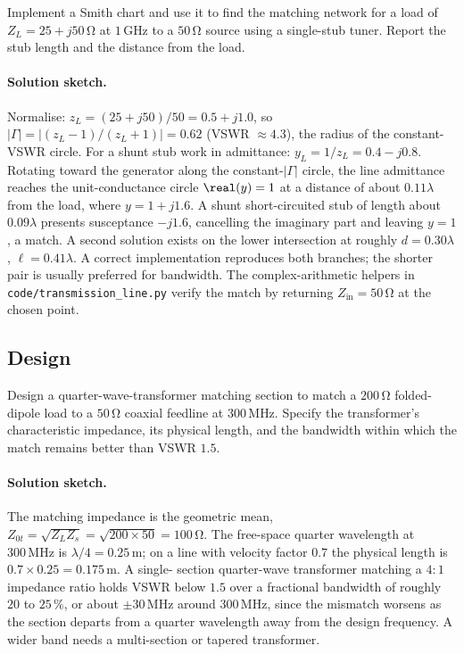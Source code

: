 \begin{exercise}
Implement a Smith chart and use it to find the matching network for a
load of $Z_{L} = 25 + j50\,\si{\ohm}$ at $1\,\si{\giga\hertz}$ to a
$50\,\si{\ohm}$ source using a single-stub tuner. Report the stub
length and the distance from the load.
\paragraph{Solution sketch.} Normalise: $z_{L} = (25+j50)/50 = 0.5 +
j1.0$, so $|\Gamma| = |(z_{L}-1)/(z_{L}+1)| = 0.62$ (VSWR $\approx
4.3$), the radius of the constant-VSWR circle. For a shunt stub work in
admittance: $y_{L} = 1/z_{L} = 0.4 - j0.8$. Rotating toward the
generator along the constant-$|\Gamma|$ circle, the line admittance
reaches the unit-conductance circle $\real(y) = 1$ at a distance of
about $0.11\lambda$ from the load, where $y = 1 + j1.6$. A shunt
short-circuited stub of length about $0.09\lambda$ presents susceptance
$-j1.6$, cancelling the imaginary part and leaving $y = 1$, a match. A
second solution exists on the lower intersection at roughly
$d = 0.30\lambda$, $\ell = 0.41\lambda$. A correct implementation
reproduces both branches; the shorter pair is usually preferred for
bandwidth. The complex-arithmetic helpers in
\texttt{code/transmission\_line.py} verify the match by returning
$Z_{\text{in}} = 50\,\si{\ohm}$ at the chosen point.
\end{exercise}

\subsection*{Design}

\begin{exercise}
Design a quarter-wave-transformer matching section to match a
$200\,\si{\ohm}$ folded-dipole load to a $50\,\si{\ohm}$ coaxial
feedline at $300\,\si{\mega\hertz}$. Specify the transformer's
characteristic impedance, its physical length, and the bandwidth
within which the match remains better than VSWR $1.5$.
\paragraph{Solution sketch.} The matching impedance is the geometric
mean, $Z_{0t} = \sqrt{Z_{L}Z_{s}} = \sqrt{200\times 50} = 100\,\si{
\ohm}$. The free-space quarter wavelength at $300\,\si{\mega\hertz}$ is
$\lambda/4 = 0.25\,\si{\meter}$; on a line with velocity factor $0.7$
the physical length is $0.7\times 0.25 = 0.175\,\si{\meter}$. A single-
section quarter-wave transformer matching a $4{:}1$ impedance ratio
holds VSWR below $1.5$ over a fractional bandwidth of roughly $20$ to
$25\,\%$, or about $\pm 30\,\si{\mega\hertz}$ around $300\,\si{\mega
\hertz}$, since the mismatch worsens as the section departs from a
quarter wavelength away from the design frequency. A wider band needs a
multi-section or tapered transformer.
\end{exercise}

